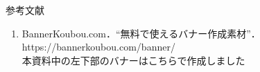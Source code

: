 \begin{frame}{参考文献}
  \begin{enumerate}[label=\textbf{［\arabic*］},itemsep=1ex, leftmargin=1cm]
    \item BannerKoubou.com．“無料で使えるバナー作成素材”．https://bannerkoubou.com/banner/ \\
          本資料中の左下部のバナーはこちらで作成しました
  \end{enumerate}
\end{frame}
